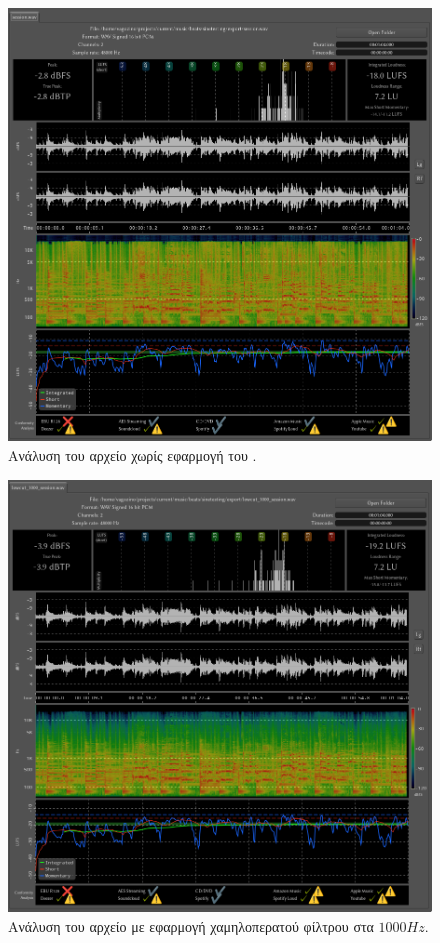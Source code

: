 \documentclass[12pt]{extarticle}
\begin{document}
\begin{figure}[htpb]
    \centering
    \includegraphics[width=\textwidth]{./assets/session.png}
    \caption{Ανάλυση του αρχείο  χωρίς εφαρμογή του .}
    \label{fig:sessionanalysis}
\end{figure}

\begin{figure}[htpb]
    \centering
    \includegraphics[width=\textwidth]{./assets/session_1000_lp.png}
    \caption{Ανάλυση του αρχείο  με εφαρμογή χαμηλοπερατού φίλτρου στα $1000Hz$.}
    \label{fig:sessionanalysislp1000}
\end{figure}
\end{document}
